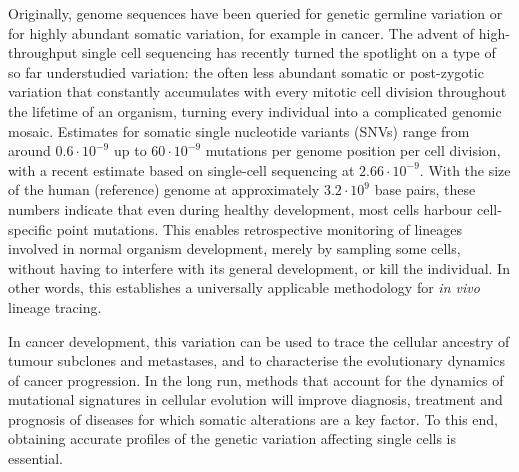 \documentclass[12pt,inline]{wlscirep}
\begin{document}
Originally, genome sequences have been queried for genetic germline variation or for highly abundant somatic variation, for example in cancer.
The advent of high-throughput single cell sequencing has recently turned the spotlight on a type of so far understudied variation: 
the often less abundant somatic or post-zygotic variation that constantly accumulates with every mitotic cell division throughout the lifetime of an organism, turning every individual into a complicated genomic mosaic\cite{forsberg_mosaicism_2017}.
Estimates for somatic single nucleotide variants (SNVs) range from around $0.6 \cdot 10^{-9}$  up to $60 \cdot 10^{-9}$  mutations per genome position per cell division\cite{lynch_rate_2010,lynch_evolution_2010,tomasetti_half_2013,li_somatic_2013}, with a recent estimate\cite{milholland_differences_2017} based on single-cell sequencing at $2.66 \cdot 10^{-9}$.
With the size of the human (reference) genome at approximately $3.2 \cdot 10^9$ base pairs, these numbers indicate that even during healthy development, most cells harbour cell-specific point mutations.
This enables retrospective monitoring of lineages involved in normal organism development, merely by sampling some cells\cite{kester_single-cell_2018}, without having to interfere with its general development, or kill the individual.
In other words, this establishes a universally applicable methodology for \textit{in vivo} lineage tracing.

In cancer development, this variation can be used to trace the cellular ancestry of tumour subclones and metastases\cite{ross_onconem:_2016,zafar_sifit:_2017,malikic_integrative_2019,kuipers_advances_2017}, and to characterise the evolutionary dynamics of cancer progression\cite{skums_inference_2019,lahnemann_eleven_2020}.
In the long run, methods that account for the dynamics of mutational signatures in cellular evolution will improve diagnosis, treatment and prognosis of diseases for which somatic alterations are a key factor.
To this end, obtaining accurate profiles of the genetic variation affecting single cells is essential.
\end{document}
